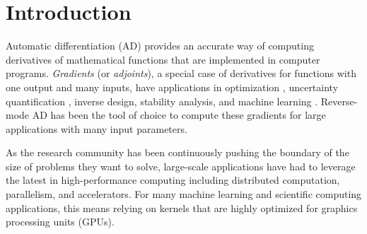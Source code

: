 \section{Introduction}
\label{sec:intro}

Automatic differentiation (AD) provides an accurate way of computing derivatives of mathematical functions that are implemented in computer programs. \emph{Gradients} (or \emph{adjoints}), a special case of derivatives for functions with one output and many inputs, have applications in optimization \cite{duchi2011adaptive}, uncertainty quantification \cite{ghanem2017handbook}, inverse design, stability analysis,%
and machine learning \cite{maclaurin2015gradient}. Reverse-mode AD  has been the tool of choice to compute these gradients for large applications with many input parameters.


As the research community has been continuously pushing the boundary of the size of problems they want to solve, large-scale applications have had to leverage the latest in high-performance computing including distributed computation, parallelism, and accelerators. %
For many machine learning and scientific computing applications, this means relying on kernels that are highly optimized for graphics processing units (GPUs). 

